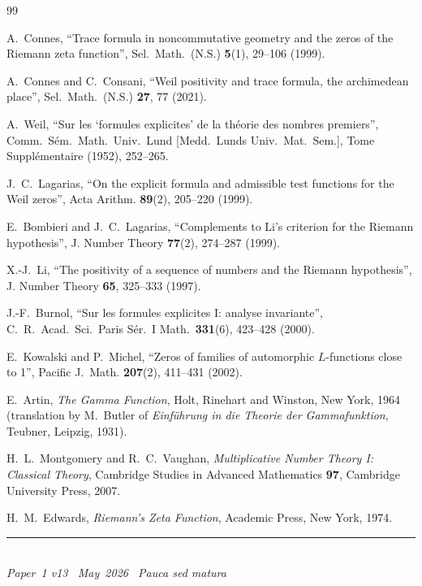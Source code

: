 \documentclass[11pt]{article}
\begin{document}
\newpage
\begin{thebibliography}{99}

A.~Connes,
``Trace formula in noncommutative geometry and the zeros of
the Riemann zeta function'',
Sel.\ Math.\ (N.S.) \textbf{5}(1), 29--106 (1999).

A.~Connes and C.~Consani,
``Weil positivity and trace formula, the archimedean place'',
Sel.\ Math.\ (N.S.) \textbf{27}, 77 (2021).

A.~Weil,
``Sur les `formules explicites' de la th\'eorie des nombres
premiers'',
Comm.\ S\'em.\ Math.\ Univ.\ Lund [Medd.\ Lunds Univ.\ Mat.\ Sem.],
Tome Suppl\'ementaire (1952), 252--265.

J.~C.~Lagarias,
``On the explicit formula and admissible test functions
for the Weil zeros'',
Acta Arithm. \textbf{89}(2), 205--220 (1999).

E.~Bombieri and J.~C.~Lagarias,
``Complements to Li's criterion for the Riemann hypothesis'',
J. Number Theory \textbf{77}(2), 274--287 (1999).

X.-J.~Li,
``The positivity of a sequence of numbers and the Riemann
hypothesis'',
J. Number Theory \textbf{65}, 325--333 (1997).

J.-F.~Burnol,
``Sur les formules explicites I: analyse invariante'',
C.\ R.\ Acad.\ Sci.\ Paris S\'er.\ I Math.\ \textbf{331}(6),
423--428 (2000).

E.~Kowalski and P.~Michel,
``Zeros of families of automorphic $L$-functions close to 1'',
Pacific J.\ Math. \textbf{207}(2), 411--431 (2002).

E.~Artin,
\emph{The Gamma Function},
Holt, Rinehart and Winston, New York, 1964
(translation by M.~Butler of \emph{Einf\"uhrung in die Theorie
der Gammafunktion}, Teubner, Leipzig, 1931).

H.~L.~Montgomery and R.~C.~Vaughan,
\emph{Multiplicative Number Theory I: Classical Theory},
Cambridge Studies in Advanced Mathematics \textbf{97},
Cambridge University Press, 2007.

H.~M.~Edwards,
\emph{Riemann's Zeta Function},
Academic Press, New York, 1974.

\end{thebibliography}

\enlargethispage{3\baselineskip}
\vspace*{\fill}
\begin{minipage}{\linewidth}
\rule{\linewidth}{0.4pt}\smallskip\\
\small\emph{Paper~1 v13 \textperiodcentered\ May~2026
\textperiodcentered\ Pauca sed matura}
\end{minipage}
\end{document}
